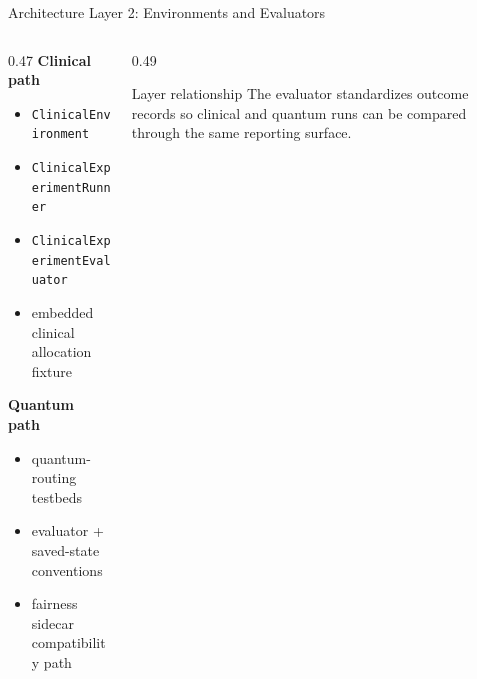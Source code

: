 \documentclass[aspectratio=169,10pt]{beamer}
\begin{document}
\begin{frame}{Architecture Layer 2: Environments and Evaluators}
\begin{columns}[T]
\begin{column}{0.47\textwidth}
\textbf{Clinical path}
\begin{itemize}
    \item \texttt{ClinicalEnvironment}
    \item \texttt{ClinicalExperimentRunner}
    \item \texttt{ClinicalExperimentEvaluator}
    \item embedded clinical allocation fixture
\end{itemize}
\vspace{0.4em}
\textbf{Quantum path}
\begin{itemize}
    \item quantum-routing testbeds
    \item evaluator + saved-state conventions
    \item fairness sidecar compatibility path
\end{itemize}
\end{column}
\begin{column}{0.49\textwidth}
\begin{center}
\end{center}
\begin{block}{Layer relationship}
The evaluator standardizes outcome records so clinical and quantum runs can be compared through the same reporting surface.
\end{block}
\end{column}
\end{columns}
\end{frame}
\end{document}
